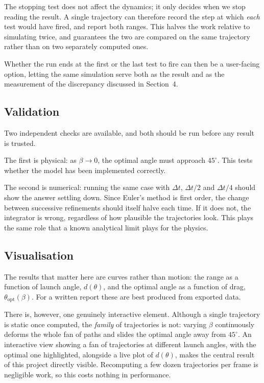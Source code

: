 \documentclass[11pt]{article}
\begin{document}
The stopping test does not affect the dynamics; it only decides when
we stop reading the result. A single trajectory can therefore record
the step at which \emph{each} test would have fired, and report both
ranges. This halves the work relative to simulating twice, and
guarantees the two are compared on the same trajectory rather than on
two separately computed ones.

Whether the run ends at the first or the last test to fire can then be
a user-facing option, letting the same simulation serve both as the
result and as the measurement of the discrepancy discussed in
Section~4.

\subsection{Validation}

Two independent checks are available, and both should be run before
any result is trusted.

The first is physical: as $\beta \to 0$, the optimal angle must
approach $45^\circ$. This tests whether the model has been
implemented correctly.

The second is numerical: running the same case with $\Delta t$,
$\Delta t/2$ and $\Delta t/4$ should show the answer settling down.
Since Euler's method is first order, the change between successive
refinements should itself halve each time. If it does not, the
integrator is wrong, regardless of how plausible the trajectories
look. This plays the same role that a known analytical limit plays
for the physics.

\subsection{Visualisation}

The results that matter here are curves rather than motion: the range
as a function of launch angle, $d(\theta)$, and the optimal angle as
a function of drag, $\theta_{\mathrm{opt}}(\beta)$. For a written
report these are best produced from exported data.

There is, however, one genuinely interactive element. Although a
single trajectory is static once computed, the \emph{family} of
trajectories is not: varying $\beta$ continuously deforms the whole
fan of paths and slides the optimal angle away from $45^\circ$. An
interactive view showing a fan of trajectories at different launch
angles, with the optimal one highlighted, alongside a live plot of
$d(\theta)$, makes the central result of this project directly
visible. Recomputing a few dozen trajectories per frame is negligible
work, so this costs nothing in performance.
\end{document}
